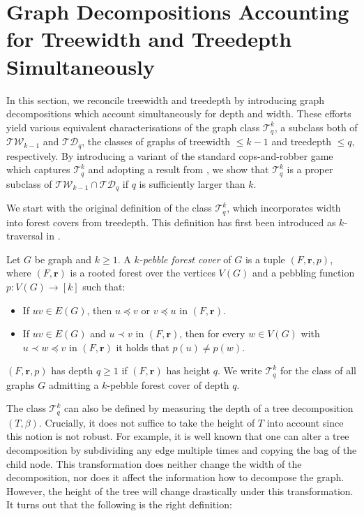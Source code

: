 \documentclass[a4paper,UKenglish,cleveref, autoref, thm-restate]{lipics-v2021}
\newcommand{\Ekq}{\ensuremath{\mathcal{T}_{q}^{k}}}
\renewcommand{\vec}[1]{\ensuremath{\boldsymbol{#1}}}
\begin{document}
 
\section{Graph Decompositions Accounting for Treewidth and Treedepth Simultaneously}
\label{sec:graph-dec}
In this section, we reconcile treewidth and treedepth by introducing graph decompositions which account simultaneously for depth and width.
These efforts yield various equivalent characterisations of the graph class $\Ekq$, a subclass both of $\mathcal{TW}_{k-1}$ and $\mathcal{TD}_q$, the classes of graphs of treewidth $\leq k -1$ and treedepth $\leq q$, respectively.
By introducing a variant of the standard cops-and-robber game which captures $\Ekq$ and adopting a result from \cite{Furer01}, we show that $\Ekq$ is a proper subclass of $\mathcal{TW}_{k-1} \cap \mathcal{TD}_q$ if $q$ is sufficiently larger than $k$.

We start with the original definition of the class \Ekq, which incorporates width into forest covers from treedepth.
This definition has first been introduced as $k$-traversal in \cite{AbramskyDW17}.

\begin{definition} \label{def:kpebbleforest}
	Let $G$ be  graph and $k\geq 1$.
	A \emph{$k$-pebble forest cover} of $G$ is a tuple $(F,\vec{r},p)$, where $(F,\vec{r})$ is a rooted forest over the vertices $V(G)$ and a pebbling function $p\colon V(G)\rightarrow [k]$ such that:
	\begin{itemize}
		\item If $uv\in E(G)$, then $u\preceq v$ or $v\preceq u$ in $(F,\vec{r})$.
		\item If $uv \in E(G)$ and $u\prec v$ in $(F,\vec{r})$, then for every $w\in V(G)$ with $u\prec w\preceq v$ in $(F,\vec{r})$ it holds that $p(u)\neq p(w)$.
	\end{itemize}
	$(F,\vec{r},p)$ has depth $q\geq 1$ if $(F,\vec{r})$ has height $q$.
	We write $\Ekq$ for the class of all graphs $G$ admitting a $k$-pebble forest cover of depth $q$.
\end{definition}

The class $\Ekq$ can also be defined by measuring the depth of a tree decomposition $(T, \beta)$.
Crucially, it does not suffice to take the height of $T$ into account since this notion is not robust.
For example, it is well known that one can alter a tree decomposition by subdividing any edge multiple times and copying the bag of the child node.
This transformation does neither change the width of the decomposition, nor does it affect the information how to decompose the graph. However, the height of the tree will change drastically under this transformation.
It turns out that the following is the right definition:
\end{document}
